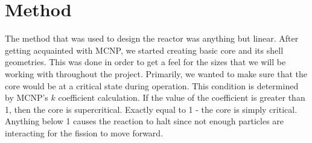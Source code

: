\section*{Method}
The method that was used to design the reactor was anything but linear. After getting acquainted with MCNP, we started creating basic core and its shell geometries. This was done in order to get a feel for the sizes that we will be working with throughout the project. Primarily, we wanted to make sure that the core would be at a critical state during operation. This condition is determined by MCNP's $k$ coefficient calculation. If the value of the coefficient is greater than 1, then the core is supercritical. Exactly equal to 1 - the core is simply critical. Anything below 1 causes the reaction to halt since not enough particles are interacting for the fission to move forward.